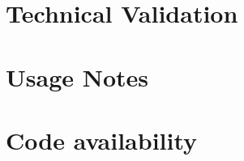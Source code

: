 \documentclass[fleqn,10pt]{wlscirep}
\begin{document}

\section*{Technical Validation}


\section*{Usage Notes}



\section*{Code availability}

\end{document}
